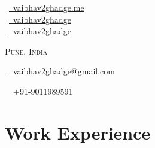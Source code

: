 \documentclass[a4paper,10pt]{extarticle} %
\begin{document}
\pagestyle{empty} %


\begin{multicols}{3}
\normalsize  \faGlobe\ {\href{https://vaibhav2ghadge.me/}{\  vaibhav2ghadge.me}}\\
\normalsize \faGithub\ {\href{https://github.com/vaibhav2ghadge}{\  vaibhav2ghadge}}\\
\normalsize  \faLinkedinSquare\ {\href{https://www.linkedin.com/in/vaibhav2ghadge}{\  vaibhav2ghadge}}\\
\columnbreak
\normalsize\par{\par} %
\par{\centering\normalsize{\textsc{Pune, India\\}}\hfill\par}
\columnbreak
\raggedright\hfill\normalsize \faEnvelope\ {\href{mailto:vaibhav2ghadge@gmail.com}{\  vaibhav2ghadge@gmail.com}}\\
\raggedright\hfill{\faPhone\ \  +91-9011989591}
\end{multicols}


\vspace{-0.7cm}
\section{\textcolor{primary}{Work Experience}}
\end{document}
